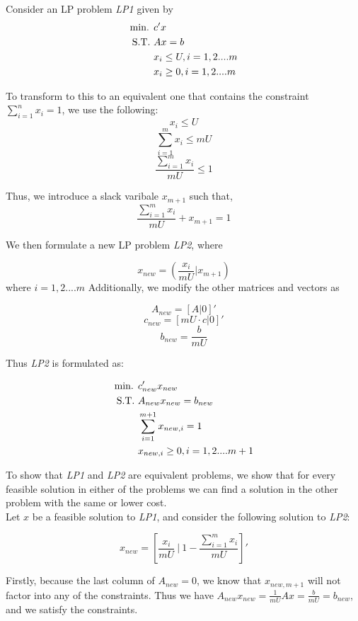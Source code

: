 Consider an LP problem \textit{LP1} given by
\begin{align}
    \text{min. } &c'x \notag\\
    \text{S.T. } &Ax = b \notag\\
    &x_i \le U, i = 1,2....m \notag\\
    &x_i \ge 0, i = 1,2....m \notag\\
\end{align}

To transform to this to an equivalent one that contains the constraint $\sum_{i=1}^{n}x_i = 1$, we use the following: 
\[ x_i \le U\]
\[ \sum_{i=1}^{m}x_i \le mU \]
\[ \frac{\sum_{i=1}^{m}x_i}{mU} \le 1\]

Thus, we introduce a slack varibale $x_{m+1}$ such that, 
\[ \frac{\sum_{i=1}^{m}x_i}{mU} + x_{m+1} = 1\]

We then formulate a new LP problem \textit{LP2}, where

\[ x_{new} = (\frac{x_i}{mU} | x_{m+1})\]
where $i=1,2....m$
Additionally, we modify the other matrices and vectors as 

\[ A_{new} = [A | 0]'\]
\[ c_{new} = [mU\cdot c | 0]'\]
\[ b_{new} = \frac{b}{mU}\]

Thus \textit{LP2} is formulated as:


\begin{align}
    \text{min. } &c_{new}'x_{new} \notag\\
    \text{S.T. } &A_{new}x_{new} = b_{new} \notag\\
    &\sum_{i=1}^{m+1}x_{new,i} = 1 \notag \\
    &x_{new,i} \ge 0, i = 1,2....m+1 \notag\\
\end{align}

To show that \textit{LP1} and \textit{LP2} are equivalent problems, we show that for every feasible solution in either of the problems we can find a solution in the other problem with the same or lower cost.\\

Let $x$ be a feasible solution to \textit{LP1}, and consider the following solution to \textit{LP2}:

\[x_{new} = \left[\frac{x_i}{mU} \:|\: 1 - \frac{\sum_{i=1}^{m}x_i}{mU}\right]'\]

Firstly, because the last column of $A_{new}=0$, we know that $x_{new, m+1}$ will not factor into any of the constraints. Thus we have $A_{new}x_{new}=\frac{1}{mU}Ax=\frac{b}{mU}=b_{new}$, and we satisfy the constraints.


